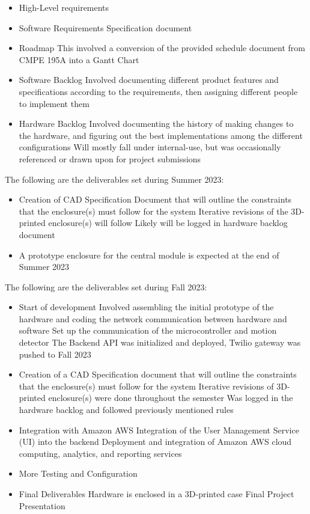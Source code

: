\begin{itemize}
    \item High-Level requirements
    \item Software Requirements Specification document
    \item Roadmap
    \subitem This involved a conversion of the provided schedule document from CMPE 195A into a Gantt Chart
    \item Software Backlog
    \subitem Involved documenting different product features and specifications according to the requirements, then assigning different people to implement them
    \item Hardware Backlog
    \subitem Involved documenting the history of making changes to the hardware, and figuring out the best implementations among the different configurations
    \subitem Will mostly fall under internal-use, but was occasionally referenced or drawn upon for project submissions
\end{itemize}

The following are the deliverables set during Summer 2023:
\begin{itemize}
    \item Creation of CAD Specification Document that will outline the
    constraints that the enclosure(s) must follow for the system
    \subitem Iterative revisions of the 3D-printed enclosure(s) will follow
    \subsubitem Likely will be logged in hardware backlog document
    \item A prototype enclosure for the central module is expected at the end of Summer 2023
\end{itemize}

The following are the deliverables set during Fall 2023:

\begin{itemize}
    \item Start of development
    \subitem Involved assembling the initial prototype of the hardware and coding
    the network communication between hardware and software
    \subitem Set up the communication of the microcontroller and motion detector
    \subitem The Backend API was initialized and deployed, Twilio gateway was pushed to Fall 2023
    \item Creation of a CAD Specification document that will outline the constraints
    that the enclosure(s) must follow for the system
    \subitem Iterative revisions of 3D-printed enclosure(s) were done throughout the
    semester
    \subitem Was logged in the hardware backlog and followed previously mentioned rules
    \item Integration with Amazon AWS
    \subitem Integration of the User Management Service (UI) into the backend
    \subitem Deployment and integration of Amazon AWS cloud computing,
    analytics, and reporting services
    \item More Testing and Configuration
    \item Final Deliverables
    \subitem Hardware is enclosed in a 3D-printed case
    \subitem Final Project Presentation
\end{itemize}